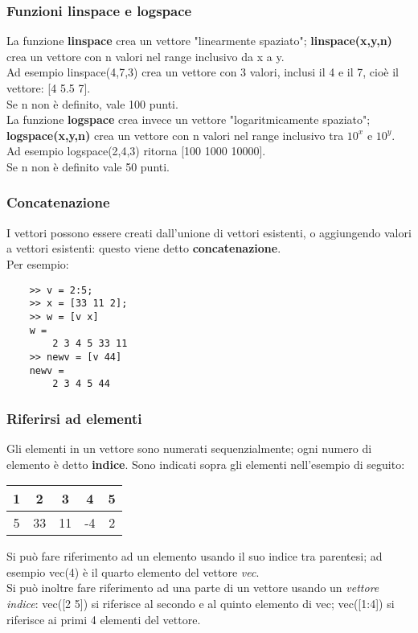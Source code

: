 \documentclass[a4paper, 10pt]{article}
\begin{document}
\subsubsection{Funzioni linspace e logspace}
La funzione \textbf{linspace} crea un vettore "linearmente spaziato"; \textbf{linspace(x,y,n)} crea un vettore con n valori nel range inclusivo da x a y.\\
Ad esempio linspace(4,7,3) crea un vettore con 3 valori, inclusi il 4 e il 7, cioè il vettore: [4  5.5  7]. \\
Se n non è definito, vale 100 punti. \medskip\\
La funzione \textbf{logspace} crea invece un vettore "logaritmicamente spaziato"; \textbf{logspace(x,y,n)} crea un vettore con n valori nel range inclusivo tra $10^x$ e $10^y$. \\
Ad esempio logspace(2,4,3) ritorna [100 1000 10000]. \\
Se n non è definito vale 50 punti.

\subsubsection{Concatenazione}
I vettori possono essere creati dall'unione di vettori esistenti, o aggiungendo valori a vettori esistenti: questo viene detto \textbf{concatenazione}.\\
Per esempio:\\
	\begin{lstlisting}
	>> v = 2:5;
	>> x = [33 11 2];
	>> w = [v x]
	w =
		2 3 4 5 33 11
	>> newv = [v 44]
	newv =
		2 3 4 5 44
	\end{lstlisting}

\subsubsection{Riferirsi ad elementi}
Gli elementi in un vettore sono numerati sequenzialmente; ogni numero di elemento è detto \textbf{indice}. Sono indicati sopra gli elementi nell'esempio di seguito:\\

\begin{tabular}{|c|c|c|c|c|}
\multicolumn{1}{c}{1} & \multicolumn{1}{c}{2} &
\multicolumn{1}{c}{3} & \multicolumn{1}{c}{4} &
\multicolumn{1}{c}{5} \\ \hline
5 & 33 & 11 & -4 & 2 \\ \hline
\end{tabular} \bigskip

\noindent
Si può fare riferimento ad un elemento usando il suo indice tra parentesi; ad esempio vec(4) è il quarto elemento del vettore \textit{vec}.\\
Si può inoltre fare riferimento ad una parte di un vettore usando un \textit{vettore indice}: vec([2 5]) si riferisce al secondo e al quinto elemento di vec; vec([1:4]) si riferisce ai primi 4 elementi del vettore.
\end{document}
